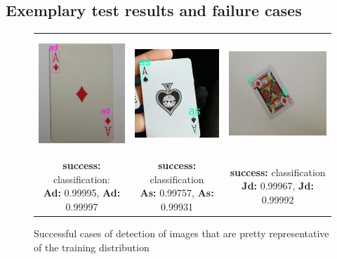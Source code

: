 \documentclass[a4paper]{article}
\begin{document}
\subsection*{Exemplary test results and failure cases}

\begin{figure}[h]

\begin{tabular}{ccc}

 \includegraphics[height=44mm]{images/ad} &   \includegraphics[height=44mm]{images/as} &   \includegraphics[height=44mm]{images/jd}\\
\makecell{\textbf{success:} classification: \\ \textbf{Ad:} 0.99995, \textbf{Ad:} 0.99997}  & \makecell{\textbf{success:}  classification \\ \textbf{As:} 0.99757, \textbf{As:} 0.99931} & \makecell{\textbf{success:}  classification \\ \textbf{Jd:} 0.99967, \textbf{Jd:} 0.99992}\\[6pt]




\end{tabular}
\caption{Successful cases of detection of images that are pretty representative of the training distribution}
\label{fig:testcases}
\end{figure}
\end{document}
